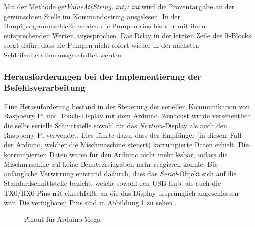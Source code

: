 
Mit der Methode \textit{getValueAt(String, int): int} wird die Prozentangabe an der gewünschten Stelle im Kommandostring ausgelesen. In der Hauptprogrammschleife werden die Pumpen eins bis vier mit ihren entsprechenden Werten angesprochen. Das Delay in der letzten Zeile des If-Blocks sorgt dafür, dass die Pumpen nicht sofort wieder in der nächsten Schleifeniteration ausgeschaltet werden.
\subsubsection{Herausforderungen bei der Implementierung der Befehlsverarbeitung}
Eine Herasuforderung bestand in der Steuerung der seriellen Kommunikation von Raspberry Pi und Touch-Display mit dem Arduino. Zunächst wurde versehentlich die selbe serielle Schnittstelle sowohl für das \textit{Nextion}-Display als auch den Raspberry Pi verwendet. Dies führte dazu, dass der Empfänger (in diesem Fall der Arduino, welcher die Mischmaschine steuert) korrumpierte Daten erhielt. Die korrumpierten Daten waren für den Arduino nicht mehr lesbar, sodass die Mischmaschine auf keine Benutezreingaben mehr reagieren konnte. Die anfängliche Verwirrung entstand dadurch, dass das \textit{Serial}-Objekt sich auf die Standardschnittstelle bezieht, welche sowohl den USB-Hub, als auch die TX0/RX0-Pins mit einschließt, an die das Display ursprünglich angeschlossen war. Die verfügbaren Pins sind in Abbildung \ref{fig:pinout_mega} zu sehen \cite{arduino_mega}.
\begin{figure}[H]
    \centering
    \caption{Pinout für Arduino Mega}
    \label{fig:pinout_mega}
\end{figure}
